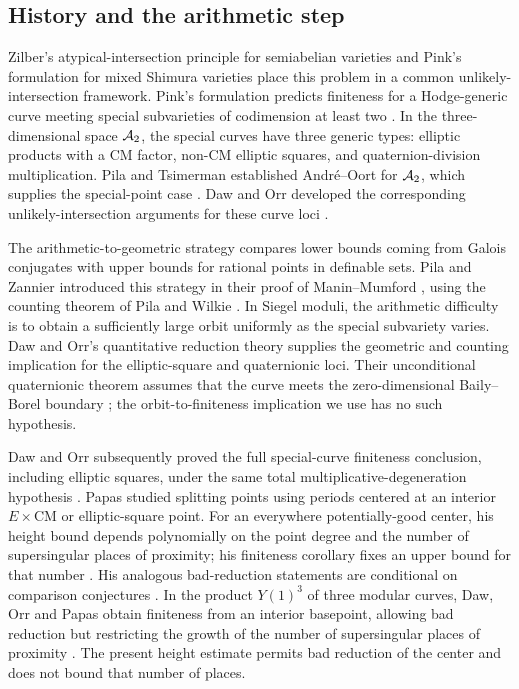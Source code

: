 \subsection{History and the arithmetic step}

Zilber's atypical-intersection principle for semiabelian varieties
\cite{Zilber2002} and Pink's formulation for mixed Shimura varieties
place this problem in a common unlikely-intersection framework.
Pink's formulation predicts finiteness for a
Hodge-generic curve meeting special subvarieties of codimension at least
two \cite[Conjecture~1.3]{Pink2005}. In the three-dimensional space
$\mathcal A_2$, the special curves have three generic types:
elliptic products with a CM factor, non-CM elliptic squares, and
quaternion-division multiplication. Pila and Tsimerman established
Andr\'e--Oort for $\mathcal A_2$, which supplies the special-point case
\cite[Theorem~1.1]{PilaTsimerman2013}. Daw and Orr developed the
corresponding unlikely-intersection arguments for these curve loci
\cite{DawOrrECM2021,DawOrr2022}.

The arithmetic-to-geometric strategy compares lower bounds coming
from Galois conjugates with upper bounds for rational points in
definable sets. Pila and Zannier introduced this strategy in their
proof of Manin--Mumford \cite{PilaZannier2008}, using the counting
theorem of Pila and Wilkie \cite{PilaWilkie2006}. In Siegel moduli,
the arithmetic difficulty is to obtain a sufficiently large orbit
uniformly as the special subvariety varies. Daw and Orr's quantitative
reduction theory supplies the geometric and counting implication
for the elliptic-square and quaternionic loci. Their unconditional
quaternionic theorem assumes that the curve meets the zero-dimensional
Baily--Borel boundary \cite[Theorem~1.4]{DawOrr2022}; the orbit-to-finiteness
implication we use has no such hypothesis.

Daw and Orr subsequently proved the full special-curve finiteness
conclusion, including elliptic squares, under the same total
multiplicative-degeneration hypothesis
\cite[Theorem~1.1 and Corollary~1.2]{DawOrrMultiplicative2025}.
Papas studied splitting points using periods centered at an interior
$E\times\mathrm{CM}$ or elliptic-square point. For an everywhere
potentially-good center, his height bound depends polynomially on the
point degree and the number of supersingular places of proximity;
his finiteness corollary fixes an upper bound for that number
\cite[Theorem~1.5 and Corollary~1.6]{PapasGFunctionsI2025}.
His analogous bad-reduction statements are conditional on comparison
conjectures \cite[Theorem~1.8 and Corollary~1.9]{PapasGFunctionsI2025}.
In the product $Y(1)^3$ of three modular curves, Daw, Orr and Papas
obtain finiteness from an interior
basepoint, allowing bad reduction but restricting the growth of the
number of supersingular places of proximity
\cite[Theorems~1.6 and~1.8]{DawOrrPapas2026}.
The present height estimate permits bad reduction of the center and
does not bound that number of places.

